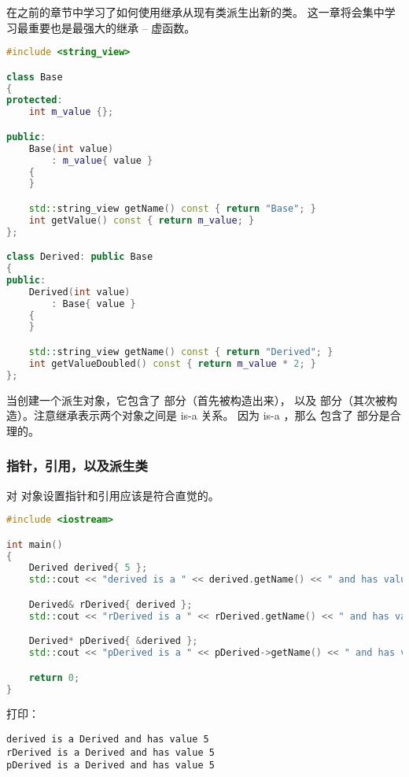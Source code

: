 \documentclass[../../LearnCpp.tex]{subfiles}
\begin{document}

在之前的章节中学习了如何使用继承从现有类派生出新的类。
这一章将会集中学习最重要也是最强大的继承 -- 虚函数。

\begin{lstlisting}[language=C++]
#include <string_view>

class Base
{
protected:
    int m_value {};

public:
    Base(int value)
        : m_value{ value }
    {
    }

    std::string_view getName() const { return "Base"; }
    int getValue() const { return m_value; }
};

class Derived: public Base
{
public:
    Derived(int value)
        : Base{ value }
    {
    }

    std::string_view getName() const { return "Derived"; }
    int getValueDoubled() const { return m_value * 2; }
};
\end{lstlisting}

当创建一个派生对象，它包含了  部分（首先被构造出来），
以及  部分（其次被构造）。注意继承表示两个对象之间是 is-a 关系。
因为  is-a ，那么  包含了  部分是合理的。

\subsubsection*{指针，引用，以及派生类}

对  对象设置指针和引用应该是符合直觉的。

\begin{lstlisting}[language=C++]
#include <iostream>

int main()
{
    Derived derived{ 5 };
    std::cout << "derived is a " << derived.getName() << " and has value " << derived.getValue() << '\n';

    Derived& rDerived{ derived };
    std::cout << "rDerived is a " << rDerived.getName() << " and has value " << rDerived.getValue() << '\n';

    Derived* pDerived{ &derived };
    std::cout << "pDerived is a " << pDerived->getName() << " and has value " << pDerived->getValue() << '\n';

    return 0;
}
\end{lstlisting}

打印：

\begin{lstlisting}
derived is a Derived and has value 5
rDerived is a Derived and has value 5
pDerived is a Derived and has value 5
\end{lstlisting}
\end{document}
